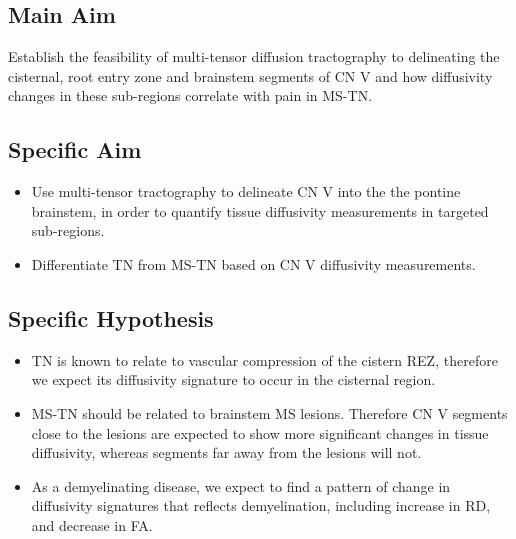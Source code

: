 \subsection{Main Aim} 
Establish the feasibility of multi-tensor diffusion tractography to delineating the cisternal, root entry zone and brainstem segments of CN V and how diffusivity changes in these sub-regions correlate with pain in MS-TN.

\subsection{Specific Aim}
\begin{itemize}
    \item Use multi-tensor tractography to delineate CN V into the the pontine brainstem, in order to quantify tissue diffusivity measurements in targeted sub-regions.
    \item Differentiate TN from MS-TN based on CN V diffusivity measurements.
\end{itemize}

\subsection{Specific Hypothesis}
\begin{itemize}
    \item TN is known to relate to vascular compression of the cistern REZ, therefore we expect its diffusivity signature to occur in the cisternal region.
    \item MS-TN should be related to brainstem MS lesions. Therefore CN V segments close to the lesions are expected to show more significant changes in tissue diffusivity, whereas segments far away from the lesions will not. 
    \item As a demyelinating disease, we expect to find a pattern of change in diffusivity signatures that reflects demyelination, including increase in RD, and decrease in FA. 
\end{itemize}

